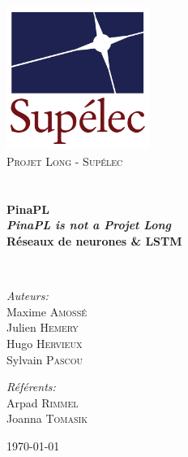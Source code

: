 
\begin{titlepage}
\begin{center}

\includegraphics[width=0.35\textwidth]{./images/logo.png}~\\[1cm]

\textsc{\LARGE Projet Long - Supélec}\\[1.5cm]

\textsc{\Large }\\[0.5cm]

\HRule
\\[0.4cm]

{\huge \bfseries PinaPL \\
\mdseries \scriptsize \textit{PinaPL is not a Projet Long} \\
\huge \bfseries Réseaux de neurones \& LSTM \\[0.4cm] }

\HRule
\\[1.5cm]

\begin{minipage}{0.4\textwidth}
\begin{flushleft} \large
\emph{Auteurs:}\\
Maxime \textsc{Amossé}\\
Julien \textsc{Hemery}\\
Hugo \textsc{Hervieux}\\
Sylvain \textsc{Pascou}
\end{flushleft}
\end{minipage}
\begin{minipage}{0.4\textwidth}
\begin{flushright} \large
\emph{Référents:} \\
Arpad \textsc{Rimmel} \\
Joanna \textsc{Tomasik}
\end{flushright}
\end{minipage}

\vfill

{\large \today}

\end{center}
\end{titlepage}
